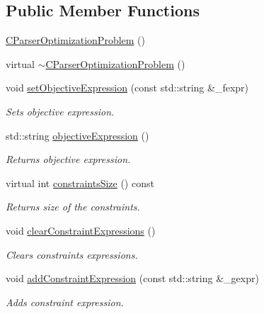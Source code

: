\subsection*{Public Member Functions}
\begin{DoxyCompactItemize}
\item 
\hyperlink{class_go_s_u_m_1_1_c_parser_optimization_problem_ae670707f9d4fea8169702fad66e8d06d}{C\-Parser\-Optimization\-Problem} ()
\item 
virtual \hyperlink{class_go_s_u_m_1_1_c_parser_optimization_problem_acd03172cb902fe1de962bb53004f34dd}{$\sim$\-C\-Parser\-Optimization\-Problem} ()
\item 
void \hyperlink{class_go_s_u_m_1_1_c_parser_optimization_problem_a03bde75b606e470d2b1f3f995295c03f}{set\-Objective\-Expression} (const std\-::string \&\-\_\-fexpr)
\begin{DoxyCompactList}\small\item\em Sets objective expression. \end{DoxyCompactList}\item 
std\-::string \hyperlink{class_go_s_u_m_1_1_c_parser_optimization_problem_a78240780535507b4f29472fc1712e722}{objective\-Expression} ()
\begin{DoxyCompactList}\small\item\em Returns objective expression. \end{DoxyCompactList}\item 
virtual int \hyperlink{class_go_s_u_m_1_1_c_parser_optimization_problem_a038c506b870e9e77f7fd50b6f9864dcb}{constraints\-Size} () const 
\begin{DoxyCompactList}\small\item\em Returns size of the constraints. \end{DoxyCompactList}\item 
void \hyperlink{class_go_s_u_m_1_1_c_parser_optimization_problem_abd7f99e4a42d777aaad785d0aba49e2c}{clear\-Constraint\-Expressions} ()
\begin{DoxyCompactList}\small\item\em Clears constraints expressions. \end{DoxyCompactList}\item 
void \hyperlink{class_go_s_u_m_1_1_c_parser_optimization_problem_a8e204a6010df7c6fc7c3c030e2624a3b}{add\-Constraint\-Expression} (const std\-::string \&\-\_\-gexpr)
\begin{DoxyCompactList}\small\item\em Adds constraint expression. \end{DoxyCompactList}\item 

\end{DoxyCompactItemize}
